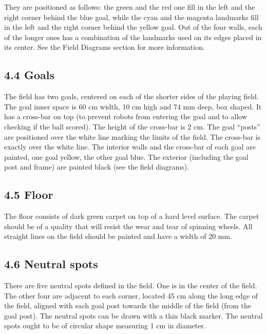 \documentclass{article}
\begin{document}
\textcolor{color-5}{They are positioned as follows: the green and the red one fill in the left and the right corner behind the blue goal, while the cyan and the magenta landmarks fill in the left and the right corner behind the yellow goal. Out of the four walls, each of the longer ones has a combination of the landmarks used on its edges placed in its center. See the Field Diagrams section for more information.}

\subsection{4.4 Goals \label{ref-032}}

The field has two goals, centered on each of the shorter sides of the playing field. The goal inner space is 60 cm width, 10 cm high and 74 mm deep, box shaped. It has a cross-bar on top (to prevent robots from entering the goal and to allow checking if the ball scored). \textcolor{color-5}{The height of the cross-bar is 2 cm.} The goal ``posts'' are positioned over the white line marking the limits of the field. The cross-bar is exactly over the white line. The interior walls and the cross-bar of each goal are painted, one goal yellow, the other goal blue. The exterior (including the goal post and frame) are painted black (see the field diagrams). 

\subsection{4.5 Floor \label{ref-033}}

The floor consists of \textcolor{color-5}{dark} green carpet on top of a hard level surface. The carpet should be of a quality that will resist the wear and tear of spinning wheels. All straight lines on the field should be painted and have a width of 20 mm.

\subsection{4.6 Neutral spots \label{ref-034}}

There are five neutral spots defined in the field. One is in the center of the field. The other four are adjacent to each corner, located 45 cm along the long edge of the field, aligned with each goal post towards the middle of the field (from the goal post). The neutral spots can be drawn with a thin black marker. The neutral spots ought to be of circular shape measuring 1 cm in diameter.
\end{document}
